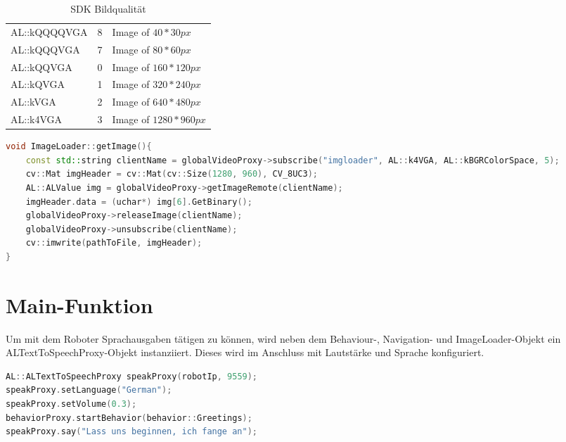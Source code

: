         \begin{table}[h]
            \caption{SDK Bildqualität}
            \label{tbl:qualities}
            \begin{center}
                \begin{tabular}[]{| l | l | l |}
                    AL::kQQQQVGA & 8 & Image of $40 * 30px$ \\
                    AL::kQQQVGA  & 7 & Image of $80 * 60px$ \\
                    AL::kQQVGA   & 0 & Image of $160 * 120px$ \\
                    AL::kQVGA    & 1 & Image of $320 * 240px$ \\
                    AL::kVGA     & 2 & Image of $640 * 480px$ \\
                    AL::k4VGA    & 3 & Image of $1280 * 960px$ \\
                \end{tabular}
            \end{center}
        \end{table}

\begin{lstlisting}[language=c++,
                   caption={Funktion: "`ImageLoader::getImage()''},
                   label={lst:imgget}]
void ImageLoader::getImage(){
    const std::string clientName = globalVideoProxy->subscribe("imgloader", AL::k4VGA, AL::kBGRColorSpace, 5);
    cv::Mat imgHeader = cv::Mat(cv::Size(1280, 960), CV_8UC3);
    AL::ALValue img = globalVideoProxy->getImageRemote(clientName);
    imgHeader.data = (uchar*) img[6].GetBinary();
    globalVideoProxy->releaseImage(clientName);
    globalVideoProxy->unsubscribe(clientName);
    cv::imwrite(pathToFile, imgHeader);
}
\end{lstlisting}

    \section{Main-Funktion}

        Um mit dem Roboter Sprachausgaben tätigen zu können, wird neben dem
        Behaviour-, Navigation- und ImageLoader-Objekt ein
        ALTextToSpeechProxy-Objekt instanziiert.
        Dieses wird im Anschluss mit Lautstärke und Sprache konfiguriert.

\begin{lstlisting}[language=c++,
                   caption={Instanziierung ALTextToSpeechProxy},
                   label={lst:alttts}]
AL::ALTextToSpeechProxy speakProxy(robotIp, 9559);
speakProxy.setLanguage("German");
speakProxy.setVolume(0.3);
behaviorProxy.startBehavior(behavior::Greetings);
speakProxy.say("Lass uns beginnen, ich fange an");
\end{lstlisting}

